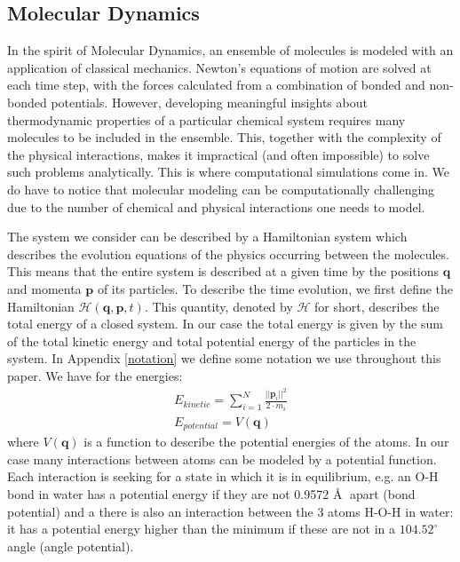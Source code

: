 \documentclass[11pt,a4paper]{article}
\begin{document}
\subsection{Molecular Dynamics}
\label{MD} %
In the spirit of Molecular Dynamics, an ensemble of molecules is modeled with an application of classical mechanics. Newton's equations of motion are solved at each time step, with the forces calculated from a combination of bonded and non-bonded potentials. However, developing meaningful insights about thermodynamic properties of a particular chemical system requires many molecules to be included in the ensemble. This, together with the complexity of the physical interactions, makes it impractical (and often impossible) to solve such problems analytically. This is where computational simulations come in. \cite{wiki} We do have to notice that molecular modeling can be computationally challenging due to the number of chemical and physical interactions one needs to model. 

The system we consider can be described by a Hamiltonian system which describes the evolution equations of the physics occurring between the molecules. This means that the entire system is described at a given time by the positions $\mathbf{q}$ and momenta $\mathbf{p}$ of its particles. To describe the time evolution, we first define the Hamiltonian $\mathcal{H}\left( \mathbf{q}, \mathbf{p}, t \right)$. This quantity, denoted by $\mathcal{H}$ for short, describes the total energy of a closed system. In our case the total energy is given by the sum of the total kinetic energy and total potential energy of the particles in the system. In Appendix \ref{notation} we define some notation we use throughout this paper. We have for the energies:
\begin{align}
E_{kinetic} = \sum\limits_{i=1}^{N} \frac{||\textbf{p}_i||^2}{2\cdot m_i} \\
E_{potential} = V(\textbf{q})
\end{align}
where $V(\textbf{q})$ is a function to describe the potential energies of the atoms. In our case many interactions between atoms can be modeled by a potential function. Each interaction is seeking for a state in which it is in equilibrium, e.g. an O-H bond in water has a potential energy if they are not 0.9572 \AA $\;$ apart (bond potential) and a there is also an interaction between the 3 atoms H-O-H in water: it has a potential energy higher than the minimum if these are not in a $104.52^\circ$ angle (angle potential).
\end{document}
